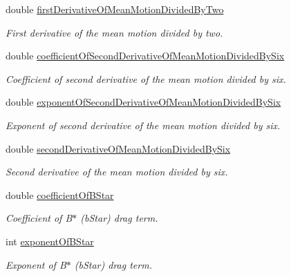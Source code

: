 \begin{DoxyCompactItemize}
double \hyperlink{structtudat_1_1input__output_1_1TwoLineElementData_a398870b0d7ec141239036ff0bb433c8e}{first\+Derivative\+Of\+Mean\+Motion\+Divided\+By\+Two}
\begin{DoxyCompactList}\small\item\em First derivative of the mean motion divided by two. \end{DoxyCompactList}\item 
double \hyperlink{structtudat_1_1input__output_1_1TwoLineElementData_a6c76fd9af28e34b9664ecdb29aa1ac00}{coefficient\+Of\+Second\+Derivative\+Of\+Mean\+Motion\+Divided\+By\+Six}
\begin{DoxyCompactList}\small\item\em Coefficient of second derivative of the mean motion divided by six. \end{DoxyCompactList}\item 
double \hyperlink{structtudat_1_1input__output_1_1TwoLineElementData_a735f1c6509a3de0d78e86e199d27f31f}{exponent\+Of\+Second\+Derivative\+Of\+Mean\+Motion\+Divided\+By\+Six}
\begin{DoxyCompactList}\small\item\em Exponent of second derivative of the mean motion divided by six. \end{DoxyCompactList}\item 
double \hyperlink{structtudat_1_1input__output_1_1TwoLineElementData_af56a5263166471fc6b0a49d3d1b55f76}{second\+Derivative\+Of\+Mean\+Motion\+Divided\+By\+Six}
\begin{DoxyCompactList}\small\item\em Second derivative of the mean motion divided by six. \end{DoxyCompactList}\item 
double \hyperlink{structtudat_1_1input__output_1_1TwoLineElementData_a5044a9e34acd7fb159560c4d29b68b45}{coefficient\+Of\+B\+Star}
\begin{DoxyCompactList}\small\item\em Coefficient of B$\ast$ (b\+Star) drag term. \end{DoxyCompactList}\item 
int \hyperlink{structtudat_1_1input__output_1_1TwoLineElementData_ad20f6d64f169548a1d986947d33f49f4}{exponent\+Of\+B\+Star}
\begin{DoxyCompactList}\small\item\em Exponent of B$\ast$ (b\+Star) drag term. \end{DoxyCompactList}\item 

\end{DoxyCompactItemize}
